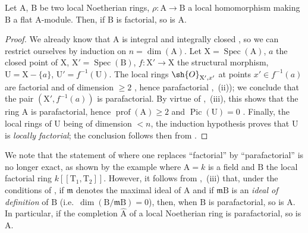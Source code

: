 \begin{proposition}[21.13.12]
\label{IV.21.13.12}
Let $\mathrm{A}$, $\mathrm{B}$ be two local Noetherian rings, $\rho:\mathrm{A}\to\mathrm{B}$ a local homomorphism making $\mathrm{B}$ a flat A-module.
Then, if $\mathrm{B}$ is factorial, so is $\mathrm{A}$.
\end{proposition}

\begin{proof}
We already know that $\mathrm{A}$ is integral and integrally closed , so we can restrict ourselves by induction on $n=\dim(\mathrm{A})$.
Let $\mathrm{X}=\operatorname{Spec}(\mathrm{A})$, $a$ the closed point of $\mathrm{X}$, $\mathrm{X}'=\operatorname{Spec}(\mathrm{B})$, $f:\mathrm{X}'\to\mathrm{X}$ the structural morphism, $\mathrm{U}=\mathrm{X}-\{a\}$, $\mathrm{U}'=f^{-1}(\mathrm{U})$.
The local rings $\sh{O}_{\mathrm{X}',x'}$ at points $x'\in f^{-1}(a)$ are factorial and of dimension $\geq 2$ , hence parafactorial ,~(ii)); we conclude  that the pair $(\mathrm{X}',f^{-1}(a))$ is parafactorial.
By virtue of ,~(iii), this shows that the ring $\mathrm{A}$ is parafactorial, hence $\operatorname{prof}(\mathrm{A})\geq 2$ and $\operatorname{Pic}(\mathrm{U})=0$ .
Finally, the local rings of $\mathrm{U}$ being of dimension $<n$, the induction hypothesis proves that $\mathrm{U}$ is \emph{locally factorial}; the conclusion follows then from .
\end{proof}

\begin{env}[21.13.12.1]
\label{IV.21.13.12.1}
We note that the statement of  where one replaces ``factorial'' by ``parafactorial'' is no longer exact, as shown by the example where $\mathrm{A}=k$ is a field and $\mathrm{B}$ the local factorial ring $k[[\mathrm{T}_1,\mathrm{T}_2]]$.
However, it follows from ,~(iii) that, under the conditions of , if $\mathfrak{m}$ denotes the maximal ideal of $\mathrm{A}$ and if $\mathfrak{m}\mathrm{B}$ is an \emph{ideal of definition} of $\mathrm{B}$ (i.e.\ $\dim(\mathrm{B}/\mathfrak{m}\mathrm{B})=0$), then, when $\mathrm{B}$ is parafactorial, so is $\mathrm{A}$.
In particular, if the completion $\widehat{\mathrm{A}}$ of a local Noetherian ring is parafactorial, so is $\mathrm{A}$.
\end{env}

